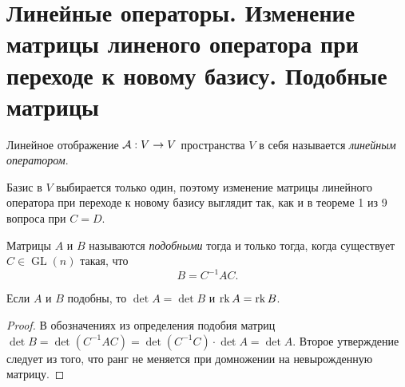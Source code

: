 \section{Линейные операторы. Изменение матрицы линеного оператора при переходе к новому базису. Подобные матрицы}

\begin{definition}
    Линейное отображение $\mathcal{A}: V \to V$ пространства $V$ в себя называется \textit{линейным оператором}.
\end{definition}

Базис в $V$ выбирается только один, поэтому изменение матрицы линейного оператора при переходе к новому базису выглядит так, как и в теореме 1 из 9 вопроса при $C = D$.

\begin{definition}
    Матрицы $A$ и $B$ называются \textit{подобными} тогда и только тогда, когда существует $C \in \operatorname{GL}(n)$ такая, что
    \[
        B = C^{-1}AC.
    \]
\end{definition}

\begin{proposal}
    Если $A$ и $B$ подобны, то $\det A = \det B$ и $\operatorname{rk} A = \operatorname{rk} B$.
\end{proposal}

\begin{proof}
    В обозначениях из определения подобия матриц $\det B = \det(C^{-1}AC) = \det(C^{-1}C) \cdot \det A = \det A$. Второе утверждение следует из того, что ранг не меняется при домножении на невырожденную матрицу.
\end{proof}

